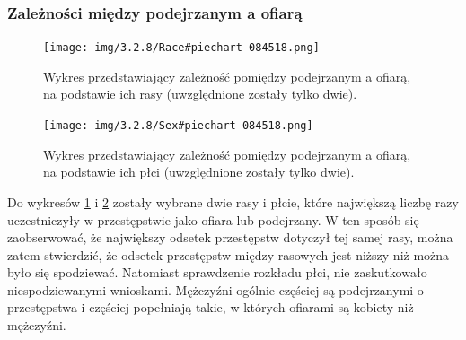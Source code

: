 \documentclass{classrep}
\begin{document}
{{            \subsubsection{Zależności między podejrzanym a ofiarą} {
                \begin{figure}[!htbp]
                    \centering
                    \texttt{[image: img/3.2.8/Race\#piechart-084518.png]}
                    \caption{Wykres przedstawiający zależność pomiędzy podejrzanym a ofiarą, na podstawie ich rasy (uwzględnione zostały tylko dwie).}
                    \label{pie_chart_race}
                \end{figure}
                \begin{figure}[!htbp]
                    \centering
                    \texttt{[image: img/3.2.8/Sex\#piechart-084518.png]}
                    \caption{Wykres przedstawiający zależność pomiędzy podejrzanym a ofiarą, na podstawie ich płci (uwzględnione zostały tylko dwie).}
                    \label{pie_chart_sex}
                \end{figure}
                \FloatBarrier

                Do wykresów \ref{pie_chart_race} i \ref{pie_chart_sex} zostały wybrane
                dwie rasy i płcie, które największą liczbę razy uczestniczyły w
                przestępstwie jako ofiara lub podejrzany. W ten sposób się
                zaobserwować, że największy odsetek przestępstw dotyczył tej samej
                rasy, można zatem stwierdzić, że odsetek przestępstw między rasowych
                jest niższy niż można było się spodziewać. Natomiast sprawdzenie
                rozkładu płci, nie zaskutkowało niespodziewanymi wnioskami. Mężczyźni
                ogólnie częściej są podejrzanymi o przestępstwa i częściej popełniają
                takie, w których ofiarami są kobiety niż mężczyźni.
            }
        }


    }
\end{document}

